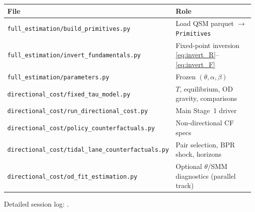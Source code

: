 \documentclass[12pt]{article}
\begin{document}
\begin{center}
\small
\begin{tabular}{p{}p{}}
\toprule
File & Role \\
\midrule
\texttt{full\_estimation/build\_primitives.py} & Load QSM parquet $\to$ \texttt{Primitives} \\
\texttt{full\_estimation/invert\_fundamentals.py} & Fixed-point inversion \eqref{eq:invert_R}--\eqref{eq:invert_F} \\
\texttt{full\_estimation/parameters.py} & Frozen $(\theta,\alpha,\beta)$ \\
\texttt{directional\_cost/fixed\_tau\_model.py} & $T$, equilibrium, OD gravity, comparisons \\
\texttt{directional\_cost/run\_directional\_cost.py} & Main Stage~1 driver \\
\texttt{directional\_cost/policy\_counterfactuals.py} & Non-directional CF specs \\
\texttt{directional\_cost/tidal\_lane\_counterfactuals.py} & Pair selection, BPR shock, horizons \\
\texttt{directional\_cost/od\_fit\_estimation.py} & Optional $\theta$/SMM diagnostics (parallel track) \\
\bottomrule
\end{tabular}
\end{center}

Detailed session log:
.



\end{document}
